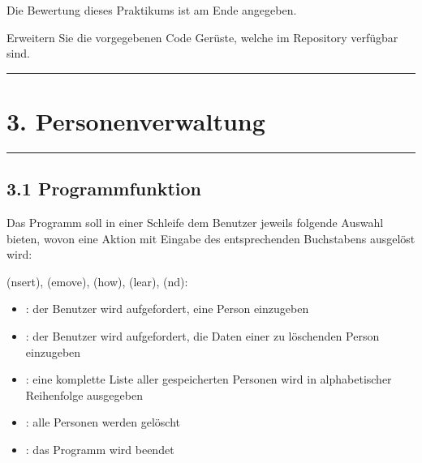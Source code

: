 \documentclass[a4paper,10pt,english]{report}
\begin{document}
\sphinxAtStartPar
Die Bewertung dieses Praktikums ist am Ende angegeben.

\sphinxAtStartPar
Erweitern Sie die vorgegebenen Code Gerüste, welche im  Repository  verfügbar sind.


\bigskip\hrule\bigskip



\section{3. Personenverwaltung}
\label{\detokenize{P06_Personen_Verwaltung_Linked_List/README:personenverwaltung}}

\bigskip\hrule\bigskip



\subsection{3.1	Programmfunktion}
\label{\detokenize{P06_Personen_Verwaltung_Linked_List/README:programmfunktion}}
\sphinxAtStartPar
Das Programm soll in einer Schleife dem Benutzer jeweils folgende Auswahl bieten, wovon eine Aktion mit Eingabe des entsprechenden Buchstabens ausgelöst wird:

\sphinxAtStartPar
{}(nsert), (emove), (how), (lear), (nd):
\begin{itemize}
\item {} 
\sphinxAtStartPar
{}: der Benutzer wird aufgefordert, eine Person einzugeben

\item {} 
\sphinxAtStartPar
{}: der Benutzer wird aufgefordert, die Daten einer zu löschenden Person einzu\sphinxhyphen{}geben

\item {} 
\sphinxAtStartPar
{}: eine komplette Liste aller gespeicherten Personen wird in alphabetischer Rei\sphinxhyphen{}henfolge ausgegeben

\item {} 
\sphinxAtStartPar
{}: alle Personen werden gelöscht

\item {} 
\sphinxAtStartPar
{}: das Programm wird beendet

\end{itemize}
\end{document}
